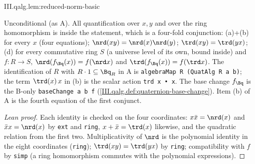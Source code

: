 \begin{lemma}
\end{lemma}
\begin{tfformal}{III.qalg.lem:reduced-norm-basic}
\begin{tffidelity}
Unconditional (as A). All quantification over $x,y$ and over the ring homomorphism is inside the statement, which is a four-fold conjunction: (a)+(b) for every $x$ (four equations); $\nrd(xy)=\nrd(x)\nrd(y)$; $\trd(xy)=\trd(yx)$; (d) for every commutative ring $S$ (a universe level of its own, bound inside) and $f\colon R\to S$, $\nrd(f_{\Bq}(x))=f(\nrd x)$ and $\trd(f_{\Bq}(x))=f(\trd x)$. The identification of $R$ with $R\cdot1\subseteq\Bq_R$ in A is \texttt{algebraMap R (QuatAlg R a b)}; the term $\trd(x)\,x$ in (b) is the scalar action \texttt{trd x • x}. The base change $f_{\Bq}$ is the B-only \texttt{baseChange a b f} (\cref{III.qalg.def:quaternion-base-change}). Item (b) of A is the fourth equation of the first conjunct.
\end{tffidelity}
\end{tfformal}
\begin{proof}[Lean proof]
Each identity is checked on the four coordinates: $x\bar x=\nrd(x)$ and $\bar x x=\nrd(x)$ by \texttt{ext} and \texttt{ring}, $x+\bar x=\trd(x)$ likewise, and the quadratic relation from the first two. Multiplicativity of $\nrd$ is the polynomial identity in the eight coordinates (\texttt{ring}); $\trd(xy)=\trd(yx)$ by \texttt{ring}; compatibility with $f$ by \texttt{simp} (a ring homomorphism commutes with the polynomial expressions).
\end{proof}

